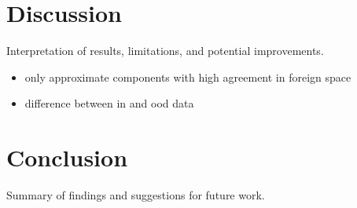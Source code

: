 \documentclass[10pt,twocolumn]{article}
\begin{document}
\section{Discussion}
Interpretation of results, limitations, and potential improvements.
\begin{itemize}
    \item only approximate components with high agreement in foreign space
    \item difference between in and ood data
\end{itemize}

\section{Conclusion}
Summary of findings and suggestions for future work.



\end{document}
